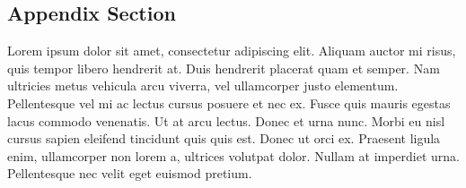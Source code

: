 \documentclass[
	a4paper, %
]{CSMakotoTechnicalReport}
\begin{document}
\begin{appendices}
\section{Appendix Section}

Lorem ipsum dolor sit amet, consectetur adipiscing elit. Aliquam auctor mi risus, quis tempor libero hendrerit at. Duis hendrerit placerat quam et semper. Nam ultricies metus vehicula arcu viverra, vel ullamcorper justo elementum. Pellentesque vel mi ac lectus cursus posuere et nec ex. Fusce quis mauris egestas lacus commodo venenatis. Ut at arcu lectus. Donec et urna nunc. Morbi eu nisl cursus sapien eleifend tincidunt quis quis est. Donec ut orci ex. Praesent ligula enim, ullamcorper non lorem a, ultrices volutpat dolor. Nullam at imperdiet urna. Pellentesque nec velit eget euismod pretium.

\end{appendices}

\end{document}
